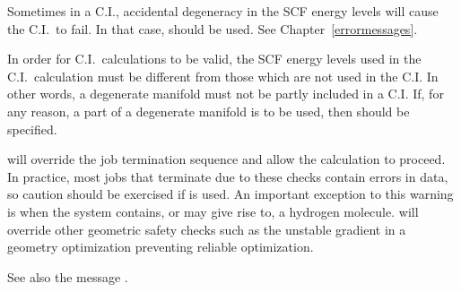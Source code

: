 Sometimes in a C.I., accidental degeneracy  in the SCF energy levels will
cause the C.I.\ to fail.  In that case,  should be used.
See Chapter~\ref{errormessages}.

In order for C.I.\ calculations to be valid, the SCF energy levels used in the
C.I.\ calculation must be different from those which are not used in the C.I.
In other words, a degenerate manifold must not be partly included in a C.I.
If, for any reason, a part of a degenerate manifold is to be used, then
 should be specified.

 will  override  the  job
termination sequence and allow the calculation to proceed.  In practice,
most jobs that terminate due to these checks contain errors in  data,  so
caution should be exercised if  is used.  An important exception to
this warning is when the system contains, or may give rise to, a hydrogen
molecule.   will override other geometric safety checks such as the
unstable  gradient  in  a  geometry  optimization   preventing   reliable
optimization.


See also the message .


